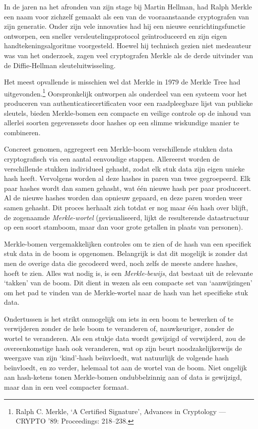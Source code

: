 \documentclass[smalldemyvopaper,11pt,twoside,onecolumn,openright,extrafontsizes,hidelinks]{memoir}
\begin{document}
In de jaren na het afronden van zijn stage bij Martin Hellman, had Ralph
Merkle een naam voor zichzelf gemaakt als een van de vooraanstaande
cryptografen van zijn generatie. Onder zijn vele innovaties had hij een
nieuwe eenrichtingsfunctie ontworpen, een sneller versleutelingsprotocol
geïntroduceerd en zijn eigen handtekeningsalgoritme voorgesteld. Hoewel
hij technisch gezien niet medeauteur was van het onderzoek, zagen veel
cryptografen Merkle als de derde uitvinder van de Diffie-Hellman
sleuteluitwisseling.

Het meest opvallende is misschien wel dat Merkle in 1979 de Merkle Tree
had uitgevonden.\footnote{Ralph C. Merkle, `A Certified Signature',
  Advances in Cryptology --- CRYPTO '89: Proceedings: 218--238.}
Oorspronkelijk ontworpen als onderdeel van een systeem voor het
produceren van authenticatiecertificaten voor een raadpleegbare lijst
van publieke sleutels, bieden Merkle-bomen een compacte en veilige
controle op de inhoud van allerlei soorten gegevenssets door hashes op
een slimme wiskundige manier te combineren.

Concreet genomen, aggregeert een Merkle-boom verschillende stukken data
cryptografisch via een aantal eenvoudige stappen. Allereerst worden de
verschillende stukken individueel gehasht, zodat elk stuk data zijn
eigen unieke hash heeft. Vervolgens worden al deze hashes in paren van
twee gegroepeerd. Elk paar hashes wordt dan samen gehasht, wat één
nieuwe hash per paar produceert. Al de nieuwe hashes worden dan opnieuw
gepaard, en deze paren worden weer samen gehasht. Dit proces herhaalt
zich totdat er nog maar één hash over blijft, de zogenaamde
\emph{Merkle-wortel} (gevisualiseerd, lijkt de resulterende
datastructuur op een soort stamboom, maar dan voor grote getallen in
plaats van personen).

Merkle-bomen vergemakkelijken controles om te zien of de hash van een
specifiek stuk data in de boom is opgenomen. Belangrijk is dat dit
mogelijk is zonder dat men de overige data die gecodeerd werd, noch
zelfs de meeste andere hashes, hoeft te zien. Alles wat nodig is, is een
\emph{Merkle-bewijs}, dat bestaat uit de relevante `takken' van de boom.
Dit dient in wezen als een compacte set van `aanwijzingen' om het pad te
vinden van de Merkle-wortel naar de hash van het specifieke stuk data.

Ondertussen is het strikt onmogelijk om iets in een boom te bewerken of
te verwijderen zonder de hele boom te veranderen of, nauwkeuriger,
zonder de wortel te veranderen. Als een stukje data wordt gewijzigd of
verwijderd, zou de overeenkomstige hash ook veranderen, wat op zijn
beurt noodzakelijkerwijs de weergave van zijn `kind'-hash beïnvloedt,
wat natuurlijk de volgende hash beïnvloedt, en zo verder, helemaal tot
aan de wortel van de boom. Niet ongelijk aan hash-ketens tonen
Merkle-bomen ondubbelzinnig aan of data is gewijzigd, maar dan in een
veel compacter formaat.
\end{document}
